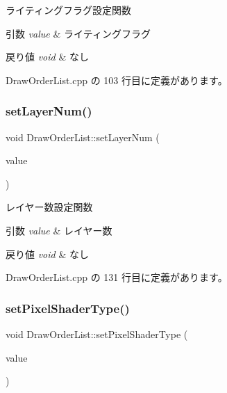 ライティングフラグ設定関数 


\begin{DoxyParams}{引数}
{\em value} & ライティングフラグ \\
\hline
\end{DoxyParams}

\begin{DoxyRetVals}{戻り値}
{\em void} & なし \\
\hline
\end{DoxyRetVals}


 Draw\+Order\+List.\+cpp の 103 行目に定義があります。

\mbox{\label{class_draw_order_list_a692fe6ddfbc8ac4167c697a1f8096c57}} 
\subsubsection{\texorpdfstring{set\+Layer\+Num()}{setLayerNum()}}
{\footnotesize\ttfamily void Draw\+Order\+List\+::set\+Layer\+Num (\begin{DoxyParamCaption}\item[{int}]{value }\end{DoxyParamCaption})}



レイヤー数設定関数 


\begin{DoxyParams}{引数}
{\em value} & レイヤー数 \\
\hline
\end{DoxyParams}

\begin{DoxyRetVals}{戻り値}
{\em void} & なし \\
\hline
\end{DoxyRetVals}


 Draw\+Order\+List.\+cpp の 131 行目に定義があります。

\mbox{\label{class_draw_order_list_a761f6f76271366ad3c0203b098087914}} 
\subsubsection{\texorpdfstring{set\+Pixel\+Shader\+Type()}{setPixelShaderType()}}
{\footnotesize\ttfamily void Draw\+Order\+List\+::set\+Pixel\+Shader\+Type (\begin{DoxyParamCaption}\item[{\mbox{\hyperlink{class_shader_manager_a7d15d773b3c6a99dd7086c45c8b0be5f}{Shader\+Manager\+::\+Pixel\+Shader\+Type}}}]{value }\end{DoxyParamCaption})}



